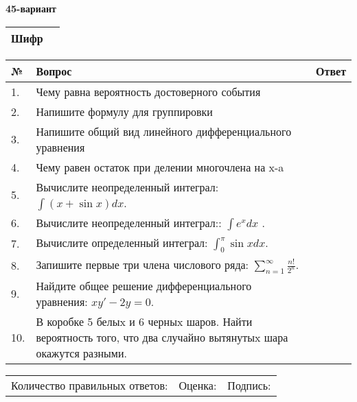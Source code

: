 \documentclass{article}
\begin{document}
  \egroup
  
  \newpage
  
  
  \textbf{45-вариант}\\
  
  \bgroup
  \def\arraystretch{1.6} %
  
  \begin{tabular}{|m{5.7cm}|m{9.5cm}|}
  \hline
  Шифр & \\
  \hline
  \end{tabular}
  
  \vspace{1cm}
  
  \begin{tabular}{|m{0.7cm}|m{10cm}|m{4cm}|}
  \hline
  № & Вопрос & Ответ \\
  \hline
  1. & Чему равна вероятность достоверного события &  \\
  \hline
  2. & Напишите формулу для группировки &  \\
  \hline
  3. & Напишите общий вид линейного дифференциального уравнения &  \\
  \hline
  4. & Чему равен остаток при делении многочлена на x-a &  \\
  \hline
  5. & Вычислите неопределенный интеграл: \(\int{(x + \sin x)}dx\). &  \\
  \hline
  6. & Вычислите неопределенный интеграл:: \(\int{e^{x}dx}\) . &  \\
  \hline
  7. & Вычислите определенный интеграл: \(\int_{0}^{\pi}{\sin xdx}\). &  \\
  \hline
  8. & Запишите первые три члена числового ряда: \(\sum_{n = 1}^{\infty}\frac{n!}{2^{n}}\). &  \\
  \hline
  9. & Найдите общее решение дифференциального уравнения: \(xy' - 2y = 0\). &  \\
  \hline
  10. & В коробке 5 белыx и 6 черныx шаров. Найти вероятность того, что два случайно вытянутыx шара окажутся разными. &  \\
  \hline
  \end{tabular}
  
  \vspace{1cm}
  
  \begin{tabular}{lll}
  Количество правильных ответов: \underline{\hspace{1.5cm}} & 
  Оценка: \underline{\hspace{1.5cm}} & 
  Подпись: \underline{\hspace{2cm}} \\
  \end{tabular}
  
\end{document}
